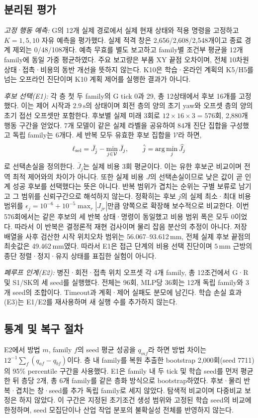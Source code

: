 \documentclass[conference,a4paper]{IEEEtran}
\begin{document}
\subsection{분리된 평가}
\emph{고정 행동 예측:}
G의 12개 실제 경로에서 실제 현재 상태와 적용 명령을 고정하고 $K=1,5,10$ 자유 예측을 평가했다.
실제 적격 창은 2,656/2,608/2,548개이고 종료 경계 제외는 0/48/108개다.
예측 무효를 별도 보고하고 family별 조건부 평균을 12개 family에 동일 가중 평균하였다.
주요 보고량은 부품 XY 끝점 오차이며, 전체 10차원 상태·접촉·비용의 동반 개선을 뜻하지 않는다.
K10은 학습·온라인 계획의 K5/H5를 넘는 오프라인 진단이며 K10 계획 제어를 실행한 결과가 아니다.

\emph{후보 선택(E1):}
각 층 첫 두 family의 G tick 0과 29, 총 12상태에서 후보 16개를 고정했다.
이는 제어 시작과 $2.9\,\mathrm s$의 상태이며 회전 층의 양의 초기 yaw와 오프셋 층의 양의 초기 접선 오프셋만 포함한다.
후보별 실제 미래 3회로 $12\times16\times3=576$회, 2,880개 행동 구간을 얻었다.
7개 모델이 같은 실제 라벨을 공유하여 84개 진단 집합을 구성했고 독립 family는 6개다.
세 반복 모두 유효한 후보 집합을 $\mathcal V$라 하면,
\begin{equation}
\ell_{\rm sel}=\bar J_{\hat j}-\min_{j\in\mathcal V}\bar J_j,
\qquad \hat j=\arg\min_j\widehat J_j
\label{eq:selection}
\end{equation}
로 선택손실을 정의한다.
$\bar J_j$는 실제 비용 3회 평균이다.
이는 유한 후보군 비교이며 전역 최적 제어와의 차이가 아니다.
또한 실제 비용 $J$의 선택손실이므로 낮은 값이 곧 인계 성공 후보를 선택했다는 뜻은 아니다.
반복 범위가 겹치는 순위는 구별 보류로 남기고 그 범위를 신뢰구간으로 해석하지 않는다.
정확히는 후보 $j$의 실제 최소·최대 비용 범위를
$\epsilon_j=10^{-6}+10^{-5}\max_r|J_{jr}|$만큼 양쪽으로 확장해 보수적으로 비교한다.
이번 576회에서는 같은 후보의 세 반복 상태·명령이 동일했고 비용 범위 폭은 모두 0이었다.
따라서 이 반복은 결정론적 재현 검사이며 물리 잡음 분산의 추정이 아니다.
저장 배열을 사후 검산한 시작 위치오차 범위는 56.067--93.612\,mm, 전체 실제 후보 끝점의 최솟값은 49.462\,mm였다.
따라서 E1은 접근 단계의 비용 선택 진단이며 $5\,\mathrm{mm}$ 근방의 종단 정렬·정지·유지 상태를 표집한 실험이 아니다.

\emph{폐루프 인계(E2):}
병진·회전·접촉 위치 오프셋 각 4개 family, 총 12조건에서 G·R 및 S1/SK의 세 seed를 실행했다.
전체는 96회, MLP당 36회는 12개 독립 family와 3개 seed의 조합이다.
Timeout과 계획·제어 실패도 분모에 남긴다.
학습 손실 효과(E3)는 E1/E2를 재사용하며 새 실행 수를 추가하지 않는다.

\subsection{통계 및 복구 절차}
E2에서 방법 $m$, family $f$의 seed 평균 성공을 $q_{mf}$라 하면 방법 차이는
$12^{-1}\sum_f(q_{af}-q_{bf})$이다.
층 내 family를 복원 추출한 bootstrap 2,000회(seed 7711)의 95\% percentile 구간을 사용했다.
E1은 family 내 두 tick 및 학습 seed를 먼저 평균한 뒤 층당 2개, 총 6개 family를 같은 층화 방식으로 bootstrap하였다.
후보·물리 반복·겹치는 창·seed를 추가 독립 family로 세지 않았다.
탐색적 비교이며 다중비교 보정은 하지 않았다.
이 구간은 지정된 초기조건 생성 범위와 고정된 학습 seed의 비교에 한정하며, seed 모집단이나 산업 작업 분포의 불확실성 전체를 반영하지 않는다.
\end{document}
